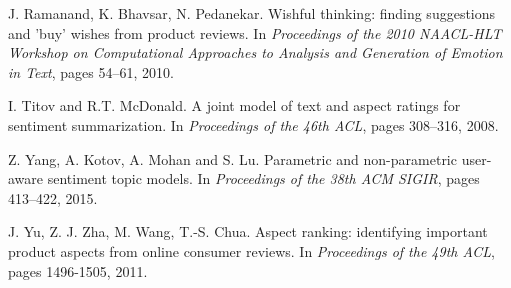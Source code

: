 \documentclass[runningheads,a4paper]{llncs}
\begin{document}
\begin{thebibliography}{4}
{
J. Ramanand, K. Bhavsar, N. Pedanekar. Wishful thinking: finding suggestions and 'buy' wishes from product reviews. In \textsl{Proceedings of the 2010 NAACL-HLT Workshop on
Computational Approaches to Analysis and Generation of Emotion in Text}, pages 54--61, 2010.

I. Titov and R.T. McDonald. A joint model of text and aspect ratings for sentiment summarization. In \textsl{Proceedings of the 46th ACL}, pages 308--316, 2008.

Z. Yang, A. Kotov, A. Mohan and S. Lu. Parametric and non-parametric user-aware sentiment topic models. In \textsl{Proceedings of the 38th ACM SIGIR}, pages 413--422, 2015.

J. Yu, Z. J. Zha, M. Wang, T.-S. Chua. Aspect ranking: identifying important product aspects from online consumer reviews. In \textsl{Proceedings of the 49th ACL}, pages
1496-1505, 2011.

}

\end{thebibliography}
\end{document}
